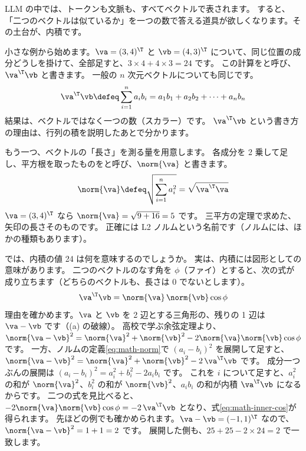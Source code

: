 LLM の中では、トークンも文脈も、すべてベクトルで表されます。
すると、「二つのベクトルは似ているか」を一つの数で答える道具が欲しくなります。その土台が、内積です。

小さな例から始めます。$\va=(3,4)^\T$ と $\vb=(4,3)^\T$ について、同じ位置の成分どうしを掛けて、全部足すと、$3\times 4+4\times 3=24$ です。
この計算をと呼び、$\va^\T\vb$ と書きます。
一般の $n$ 次元ベクトルについても同じです。
\begin{equation}
\va^\T\vb \defeq \sum_{i=1}^{n} a_i b_i = a_1b_1+a_2b_2+\dots+a_nb_n
\label{eq:math-inner}
\end{equation}
結果は、ベクトルではなく一つの数（スカラー）です。
$\va^\T\vb$ という書き方の理由は、行列の積を説明したあとで分かります。

もう一つ、ベクトルの「長さ」を測る量を用意します。
各成分を 2 乗して足し、平方根を取ったものをと呼び、$\norm{\va}$ と書きます。
\begin{equation}
\norm{\va}\defeq\sqrt{\sum_{i=1}^{n}a_i^{2}}=\sqrt{\va^\T\va}
\label{eq:math-norm}
\end{equation}
$\va=(3,4)^\T$ なら $\norm{\va}=\sqrt{9+16}=5$ です。
三平方の定理で求めた、矢印の長さそのものです。
正確には L2 ノルムという名前です（ノルムには、ほかの種類もあります）。

では、内積の値 24 は何を意味するのでしょうか。
実は、内積には図形としての意味があります。
二つのベクトルのなす角を $\phi$（ファイ）とすると、次の式が成り立ちます（どちらのベクトルも、長さは 0 でないとします）。
\begin{equation}
\va^\T\vb=\norm{\va}\,\norm{\vb}\cos\phi
\label{eq:math-inner-cos}
\end{equation}
理由を確かめます。$\va$ と $\vb$ を 2 辺とする三角形の、残りの 1 辺は $\va-\vb$ です（(a) の破線）。
高校で学ぶ余弦定理より、$\norm{\va-\vb}^{2}=\norm{\va}^{2}+\norm{\vb}^{2}-2\norm{\va}\norm{\vb}\cos\phi$ です。
一方、ノルムの定義\eqref{eq:math-norm}で $(a_i-b_i)^{2}$ を展開して足すと、$\norm{\va-\vb}^{2}=\norm{\va}^{2}+\norm{\vb}^{2}-2\,\va^\T\vb$ です。
成分一つぶんの展開は $(a_i-b_i)^{2}=a_i^{2}+b_i^{2}-2a_ib_i$ です。
これを $i$ について足すと、$a_i^{2}$ の和が $\norm{\va}^{2}$、$b_i^{2}$ の和が $\norm{\vb}^{2}$、$a_ib_i$ の和が内積 $\va^\T\vb$ になるからです。
二つの式を見比べると、$-2\norm{\va}\norm{\vb}\cos\phi=-2\,\va^\T\vb$ となり、式\eqref{eq:math-inner-cos}が得られます。
先ほどの例でも確かめられます。$\va-\vb=(-1,1)^\T$ なので、$\norm{\va-\vb}^{2}=1+1=2$ です。
展開した側も、$25+25-2\times 24=2$ で一致します。

